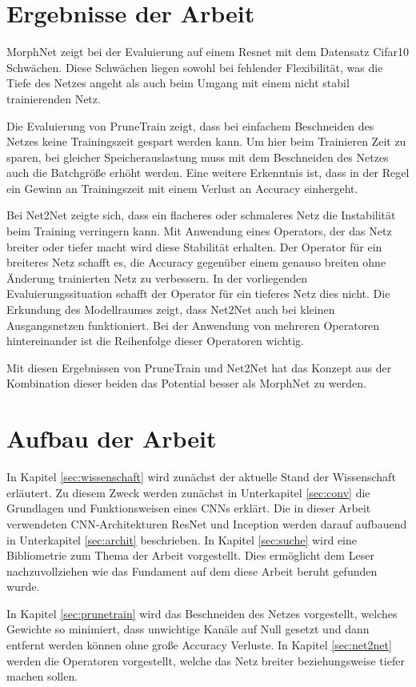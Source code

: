 \section{Ergebnisse der Arbeit}\label{sec:ergebnis}
MorphNet zeigt bei der Evaluierung auf einem Resnet mit dem Datensatz Cifar10 Schwächen. Diese Schwächen liegen sowohl bei fehlender Flexibilität, was die Tiefe des Netzes angeht als auch beim Umgang mit einem nicht stabil trainierenden Netz.

Die Evaluierung von PruneTrain zeigt, dass bei einfachem Beschneiden des Netzes keine Trainingszeit gespart werden kann. Um hier beim Trainieren Zeit zu sparen, bei gleicher Speicherauslastung muss mit dem Beschneiden des Netzes auch die Batchgröße erhöht werden. Eine weitere Erkenntnis ist, dass in der Regel ein Gewinn an Trainingszeit mit einem Verlust an Accuracy einhergeht.

Bei Net2Net zeigte sich, dass ein flacheres oder schmaleres Netz die Instabilität beim Training verringern kann. Mit Anwendung eines Operators, der das Netz breiter oder tiefer macht wird diese Stabilität erhalten. Der Operator für ein breiteres Netz schafft es, die Accuracy gegenüber einem genauso breiten ohne Änderung trainierten Netz zu verbessern. In der vorliegenden Evaluierungssituation schafft der Operator für ein tieferes Netz dies nicht.
Die Erkundung des Modellraumes zeigt, dass Net2Net auch bei kleinen Ausgangsnetzen funktioniert. Bei der Anwendung von mehreren Operatoren hintereinander ist die Reihenfolge dieser Operatoren wichtig.

Mit diesen Ergebnissen von PruneTrain und Net2Net hat das Konzept aus der Kombination dieser beiden das Potential besser als MorphNet zu werden.

\section{Aufbau der Arbeit}\label{sec:aufbau}
In Kapitel \ref{sec:wissenschaft} wird zunächst der aktuelle Stand der Wissenschaft erläutert. Zu diesem Zweck werden zunächst in Unterkapitel \ref{sec:conv} die Grundlagen und Funktionsweisen eines CNNs erklärt. Die in dieser Arbeit verwendeten CNN-Architekturen ResNet und Inception werden darauf aufbauend in Unterkapitel \ref{sec:archit} beschrieben. In Kapitel \ref{sec:suche} wird eine Bibliometrie zum Thema der Arbeit vorgestellt. Dies ermöglicht dem Leser nachzuvollziehen wie das Fundament auf dem diese Arbeit beruht gefunden wurde. 


In Kapitel \ref{sec:prunetrain} wird das Beschneiden des Netzes vorgestellt, welches Gewichte so minimiert, dass unwichtige Kanäle auf Null gesetzt und dann entfernt werden können ohne große Accuracy Verluste. In Kapitel \ref{sec:net2net} werden die Operatoren vorgestellt, welche das Netz breiter beziehungsweise tiefer machen sollen.


